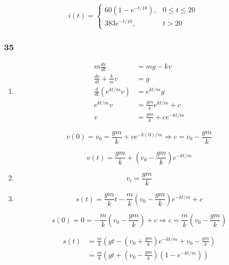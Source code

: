 \documentclass{article}
\begin{document}
\[i(t) = \begin{cases}
    60 (1 - e^{-t / 10}), & 0 \le t \le 20 \\
    383 e^{-t / 10},      & t > 20
  \end{cases}\]

\subsubsection{35}

\begin{enumerate}
  \item

        \begin{align*}
          m \frac{dv}{dt}               & = m g - k v                      \\
          \frac{dv}{dt} + \frac{k}{m} v & = g                              \\
          \frac{d}{dt} (e^{k t / m} v)  & = e^{k t / m} g                  \\
          e^{k t / m} v                 & = \frac{g m}{k} e^{k t / m} + c  \\
          v                             & = \frac{g m}{k} + c e^{-k t / m}
        \end{align*}

        \[v(0) = v_0 = \frac{g m}{k} + c e^{-k (0) / m} \Rightarrow c = v_0 - \frac{g m}{k}\]

        \[v(t) = \frac{g m}{k} + \left( v_0 - \frac{g m}{k} \right) e^{-k t / m}\]

  \item \[v_t = \frac{g m}{k}\]

  \item

        \[s(t) = \frac{g m}{k} t - \frac{m}{k} \left( v_0 - \frac{g m}{k} \right) e^{-k t / m} + c\]

        \[s(0) = 0 = -\frac{m}{k} \left( v_0 - \frac{g m}{k} \right) + c \Rightarrow c = \frac{m}{k} \left( v_0 - \frac{g m}{k} \right)\]

        \begin{align*}
          s(t) & = \frac{m}{k} \left( g t - \left( v_0 + \frac{g m}{k} \right) e^{-k t / m} + v_0 - \frac{g m}{k} \right) \\
               & = \frac{m}{k} \left( g t + \left( v_0 - \frac{g m}{k} \right) \left( 1 - e^{-k t / m} \right) \right)
        \end{align*}
\end{enumerate}
\end{document}
